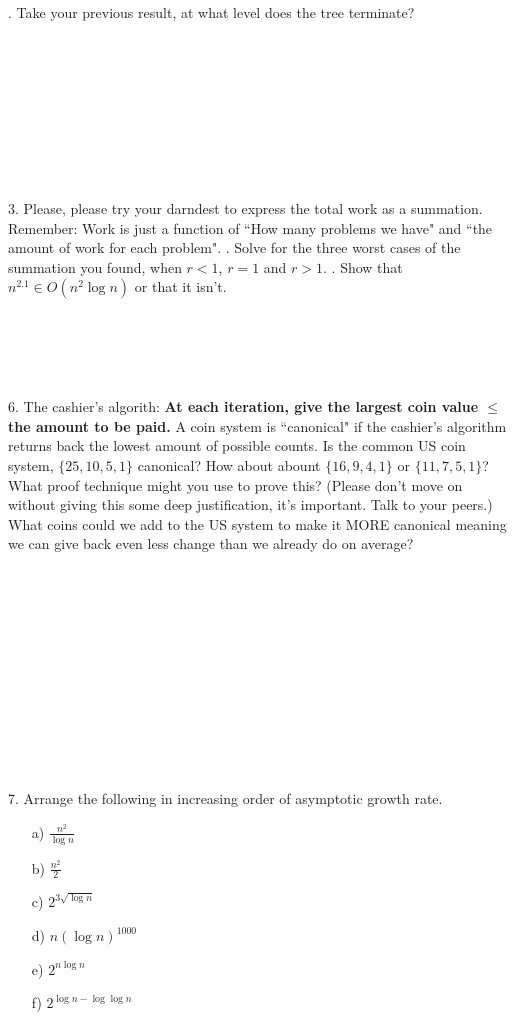 \documentclass[12pt]{article}
\begin{document}
\newpage
{}. Take your previous result, at what level does the tree terminate?\\\\\\\\\\\\\\\\\\\\
3. Please, please try your darndest to express the total work as a summation. Remember: Work is just a function of ``How many problems we have" and ``the amount of work for each problem".
\newpage
{}. Solve for the three worst cases of the summation you found, when $r<1$, $r=1$ and $r>1$. 
\newpage
{}. Show that $n^{2.1} \in O(n^2\log{n})$ or that it isn't.\\\\\\\\\\\\
6. The cashier's algorith: \textbf{At each iteration, give the largest coin value $\leq$ the amount to be paid.} A coin system is ``canonical" if the cashier's algorithm returns back the lowest amount of possible counts. Is the common US coin system, $\{25,10,5,1\}$ canonical? How about abount $\{16,9,4,1\}$ or $\{11,7,5,1\}$? What proof technique might you use to prove this? (Please don't move on without giving this some deep justification, it's important. Talk to your peers.) What coins could we add to the US system to make it MORE canonical meaning we can give back even less change than we already do on average?\\\\\\\\\\\\\\\\\\\\\\\\\\
7. Arrange the following in increasing order of asymptotic growth rate.
\begin{enumerate}
    \item[a)]$\frac{n^2}{\log{n}}$
    \item[b)]$\frac{n^2}{2}$
    \item[c)]$2^{3\sqrt{\log{n}}}$
    \item[d)]$n(\log{n})^{1000}$
    \item[e)]$2^{n\log{n}}$
    \item[f)]$2^{\log{n}-\log{\log{n}}}$ 
\end{enumerate}
\end{document}
